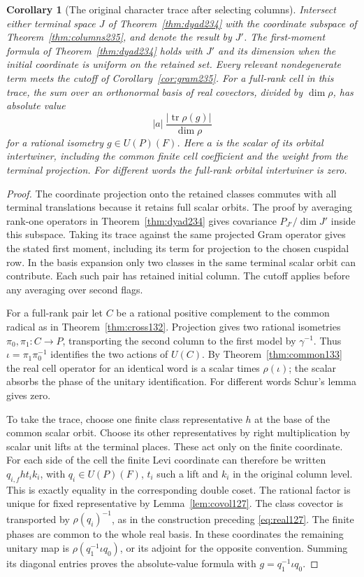 \documentclass[a4paper,11pt]{article}
\newtheorem{corollary}[proposition]{Corollary}
\theoremstyle{definition}
\theoremstyle{remark}
\numberwithin{equation}{section}
\begin{document}
\begin{corollary}[The original character trace after selecting columns]
\leavevmode\label{cor:trace235}
Intersect either terminal space \(J\) of Theorem~\ref{thm:dyad234}
with the coordinate subspace of Theorem~\ref{thm:columns235},
and denote the result by \(J'\). The first-moment formula of
Theorem~\ref{thm:dyad234} holds with \(J'\) and its dimension
when the initial coordinate is uniform on the retained set.
Every relevant nondegenerate term meets the cutoff of
Corollary~\ref{cor:gram235}. For a full-rank cell in this trace,
the sum over an orthonormal basis of real covectors, divided by
\(\dim\rho\), has absolute value
\[
              |a|\ \frac{|\operatorname{tr}\rho(g)|}{\dim\rho}
\]
for a rational isometry \(g\in U(P)(F)\). Here \(a\) is the
scalar of its orbital intertwiner, including the common finite
cell coefficient and the weight from the terminal projection.
For different words the full-rank orbital intertwiner is zero.
\end{corollary}
\begin{proof}
The coordinate projection onto the retained classes commutes
with all terminal translations because it retains full scalar
orbits. The proof by averaging rank-one operators in
Theorem~\ref{thm:dyad234} gives covariance
\(P_{J'}/\dim J'\) inside this subspace. Taking its trace against
the same projected Gram operator gives the stated first moment,
including its term for projection to the chosen cuspidal row.
In the basis expansion only two classes in the same terminal
scalar orbit can contribute. Each such pair has retained initial
column. The cutoff applies before any averaging over second flags.

For a full-rank pair let \(C\) be a rational positive complement
to the common radical as in Theorem~\ref{thm:cross132}.
Projection gives two rational isometries
\(\pi_0,\pi_1:C\longrightarrow P\), transporting the second
column to the first model by \(\gamma^{-1}\). Thus
\(\iota=\pi_1\pi_0^{-1}\) identifies the two actions of
\(U(C)\). By Theorem~\ref{thm:common133} the real cell
operator for an identical word is a scalar times \(\rho(\iota)\);
the scalar absorbs the phase of the unitary identification.
For different words Schur's lemma gives zero.

To take the trace, choose one finite class representative \(h\)
at the base of the common scalar orbit. Choose its other
representatives by right multiplication by scalar unit lifts
at the terminal places. These act only on the finite coordinate.
For each side of the cell the finite Levi coordinate can
therefore be written \(q_{i,f}h t_i k_i\), with \(q_i\in
U(P)(F)\), \(t_i\) such a lift and \(k_i\) in the original
column level. This is exactly equality in the corresponding
double coset. The rational factor is unique for fixed
representative by Lemma~\ref{lem:covol127}.
The class covector is transported by \(\rho(q_i)^{-1}\), as
in the construction preceding \eqref{eq:real127}. The finite
phases are common to the whole real basis. In these coordinates
the remaining unitary map is \(\rho(q_1^{-1}\iota q_0)\), or
its adjoint for the opposite convention. Summing its diagonal
entries proves the absolute-value formula with
\(g=q_1^{-1}\iota q_0\).
\end{proof}
\end{document}
